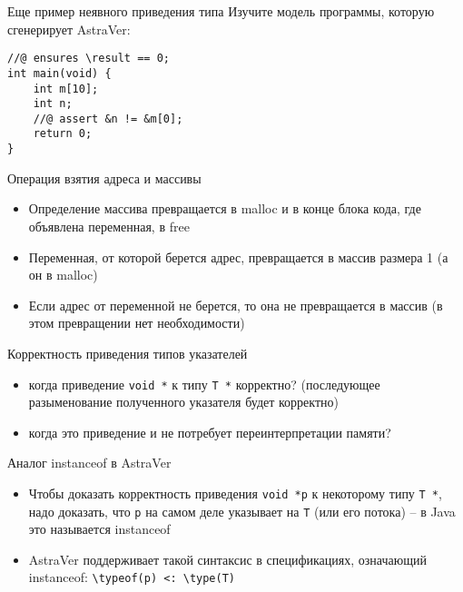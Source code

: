 \documentclass[hyperref={unicode=true}]{beamer}
\begin{document}
    \begin{frame}[fragile]{Еще пример неявного приведения типа}
    Изучите модель программы, которую сгенерирует AstraVer:
    \begin{lstlisting}
//@ ensures \result == 0;
int main(void) {
    int m[10];
    int n;
    //@ assert &n != &m[0];
    return 0;
}
    \end{lstlisting}
    \end{frame}

    \begin{frame}{Операция взятия адреса и массивы}
    \begin{itemize}
    \item
    Определение массива превращается в malloc и в конце блока кода,
    где объявлена переменная, в free
    \item
    Переменная, от которой берется адрес, превращается в массив
    размера 1 (а он в malloc)
    \item
    Если адрес от переменной не берется, то она не превращается
    в массив (в этом превращении нет необходимости)
    \end{itemize}
    \end{frame}

    \begin{frame}{Корректность приведения типов указателей}
    \begin{itemize}
    \item когда приведение \texttt{void *} к
    типу \texttt{T *} корректно? (последующее разыменование
    полученного указателя будет корректно)
    \item когда это приведение и не потребует переинтерпретации
    памяти?
    \end{itemize}
    \end{frame}

    \begin{frame}{Аналог instanceof в AstraVer}
    \begin{itemize}
    \item
    Чтобы доказать корректность приведения \texttt{void *p}
    к некоторому типу \texttt{T *}, надо доказать, что
    \texttt{p} на самом деле указывает на \texttt{T} (или
    его потока) -- в Java это называется instanceof
    \item
    AstraVer поддерживает такой синтаксис в спецификациях,
    означающий instanceof:
    \texttt{\textbackslash{}typeof(p) <: \textbackslash{}type(T)}
    \end{itemize}
    \end{frame}
\end{document}
